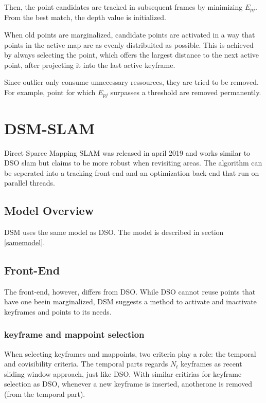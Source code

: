 \begin{enumerate}
	Then, the point candidates are tracked in subsequent frames by minimizing $E_{pj}$. From the best match, the depth value is initialized. 
	
	When old points are marginalized, candidate points are activated in a way that points in the active map are as evenly distribuited 
	as possible. This is achieved by always selecting the point, which offers the largest distance to the next active point, after projecting
	it into the last active keyframe. 
	
	Since outlier only consume unnecessary ressources, they are tried to be removed. For example, point for which $E_{pj}$ surpasses a threshold 
	are removed permanently. 
	
	\end{enumerate}

	\section{DSM-SLAM}
	
	Direct Sparce Mapping SLAM was released in april 2019 and works similar to DSO slam but claims to be more robust when revisiting 
	areas. The algorithm can be seperated into a tracking 
	front-end and an optimization back-end that run on parallel threads. 
	
	\subsection{Model Overview}
	
		DSM uses the same model as DSO. The model is described in section \ref{samemodel}.
	
	\subsection{Front-End}
	
	The front-end, however, differs from DSO. While DSO cannot reuse points that have one beein marginalized, DSM suggests a method 
	to activate and inactivate keyframes and points to its needs. 
	
	\subsubsection{keyframe and mappoint selection}
	
	When selecting keyframes and mappoints, two criteria play a role: the temporal and covisibility criteria. 
	The temporal parts regards $N_t$ keyframes as recent sliding window approach, just like DSO. With similar 
	critirias for keyframe selection as DSO, whenever a new keyframe is inserted, anotherone is removed (from the temporal part).

